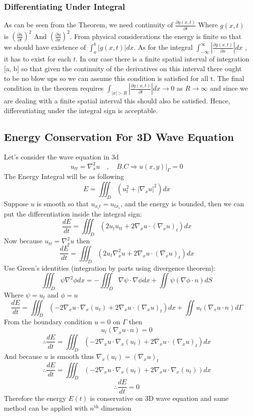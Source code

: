 \documentclass[]{article}
\begin{document}
\subsubsection*{Differentiating Under Integral}
As can be seen from the Theorem, we need continuity of 
$\displaystyle \frac{\partial g(x, t)}{\partial t}$
Where $g(x,t)$ is 
$\displaystyle {\left(\frac{\partial u}{\partial t}\right)}^2$
And
$\displaystyle {\left(\frac{\partial u}{\partial x}\right)}^2$. 
From physical considerations the energy is finite so that we should have existence of
$\displaystyle \int_{a}^{b} |g(x,t)|dx$. As for the integral
$\displaystyle \int_{-\infty}^{\infty} \left|\frac{\partial g(x,t)}{\partial x}\right|dx$
, it has to exist for each $t$. In our case there is a finite spatial interval of integration
[a, b] so that given the continuity of the derivatives on this interval there ought
to be no blow ups so we can assume this condition is satisfied for all t. 
The final condition in the theorem requires
$\displaystyle \int_{|x|>R} |\frac{\partial g(x,t)}{\partial t}| dx \to 0 $ as $R \to \infty$
and since we are dealing with a finite spatial interval this should also be satisfied.
Hence, differentiating under the integral sign is acceptable.

\subsection{Energy Conservation For 3D Wave Equation}
Let's consider the wave equation in 3d
\[
u_{tt} = \nabla_x^2 u \quad,\quad B.C \Longrightarrow  u(x,y)|_\Gamma = 0
\]
The Energy Integral will be as following
\[
    E = \iiint_{D}(u_t^2 + |\nabla_x u|^2) dx
\]
Suppose $u$ is smooth so that $u_{x_{i}t}=u_{t x_{i}}$, 
and the energy is bounded, then we can put the differentiation inside the integral sign:
\[
\frac{dE}{dt} = \iiint_{D}(  2 u_t u_{tt} + 2 \nabla_x u \cdot (\nabla_x u)_t) dx
\]
Now because $u_{tt} = \nabla_x^2 u$ then
\[
    \frac{dE}{dt} = \iiint_{D}(  2 u_t \nabla_x^2 u + 2 \nabla_x u \cdot (\nabla_x u)_t) dx
\]
Use Green's identities (integration by parts using divergence theorem):
\[
    \iiint_{D} \psi \nabla^2 \phi dx = -\iiint_{D} \nabla \psi \cdot \nabla \phi dx + \iint \psi (\nabla \phi \cdot n )dS
\]
Where $\psi = u_t $ and  $\phi = u$
\[
    \frac{dE}{dt} = \iiint_{D}( -2 \nabla_x u \cdot \nabla_x (u_t) + 2\nabla_x u \cdot (\nabla_x u)_t) dx  + \iint u_t(\nabla_x u \cdot n )d\Gamma
\]
From the boundary condition $u=0$ on $\Gamma$ then 
\[
    u_t(\nabla_x u \cdot n ) = 0
\]
\[
  \therefore  \frac{dE}{dt} = \iiint_{D}( -2 \nabla_x u \cdot \nabla_x (u_t) + 2\nabla_x u \cdot (\nabla_x u)_t) dx
\]
And because $u$ is smooth thus $\nabla_x (u_t) =(\nabla_x u)_t$
\[
  \therefore  \frac{dE}{dt} = \iiint_{D}( -2 \nabla_x u \cdot \nabla_x (u_t) + 2 \nabla_x u \cdot \nabla_x (u_t)) dx
\]
\[
    \therefore  \frac{dE}{dt} = 0
\]
Therefore the energy $E(t)$ is conservative on 3D wave equation and same method can be applied with 
$n^{\text{th}}$ dimension 
\end{document}

